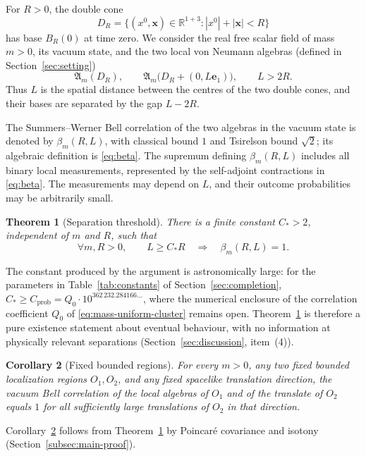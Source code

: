 \documentclass[11pt]{amsart}
\numberwithin{equation}{section}
\newtheorem{theorem}{Theorem}[section]
\newtheorem{corollary}[theorem]{Corollary}
\theoremstyle{definition}
\newcommand{\A}{\mathfrak A}
\newcommand{\R}{\mathbb R}
\newcommand{\bx}{\mathbf x}
\newcommand{\eone}{\mathbf e_1}
\begin{document}
For \(R>0\), the double cone
\[
 D_R=\{(x^0,\bx)\in\R^{1+3}: |x^0|+|\bx|<R\}
\]
has base \(B_R(0)\) at time zero. We consider the real free scalar field
of mass \(m>0\), its vacuum state, and the two local von Neumann algebras (defined in
Section~\ref{sec:setting})
\[
 \A_m(D_R),\qquad \A_m\bigl(D_R+(0,L\eone)\bigr),\qquad L>2R.
\]
Thus \(L\) is the spatial distance between the centres of the two
double cones, and their bases are separated by the gap \(L-2R\).

The Summers--Werner Bell correlation of the two algebras in the vacuum
state is denoted by
\(\beta_m(R,L)\), with classical bound \(1\) and Tsirelson bound
\(\sqrt2\); its algebraic definition is \eqref{eq:beta}. The supremum defining
\(\beta_m(R,L)\) includes all binary local measurements, represented by the
self-adjoint contractions in \eqref{eq:beta}. The measurements may depend on \(L\), and their outcome probabilities may be
arbitrarily small.

\begin{theorem}[Separation threshold]\label{thm:main}
There is a finite constant \(C_*>2\), independent of \(m\) and \(R\),
such that
\begin{equation}
 \forall m,R>0,\qquad
 L\ge C_*R\quad\Longrightarrow\quad \beta_m(R,L)=1.
 \label{eq:main}
\end{equation}
\end{theorem}

The constant produced by the argument is astronomically large: for the
parameters in Table~\ref{tab:constants} of Section~\ref{sec:completion}, \(C_*\ge C_{\mathrm{prob}}=Q_0\cdot10^{362\,232.284166\ldots}\), where the
numerical enclosure of the correlation coefficient \(Q_0\) of
\eqref{eq:mass-uniform-cluster} remains open. Theorem~\ref{thm:main} is therefore a pure
existence statement about eventual behaviour, with no information at
physically relevant separations (Section~\ref{sec:discussion},
item~(4)).

\begin{corollary}[Fixed bounded regions]\label{cor:fixed}
For every \(m>0\), any two fixed bounded localization regions
\(O_1,O_2\), and any fixed spacelike translation direction, the vacuum
Bell correlation of the local algebras of \(O_1\) and of the translate
of \(O_2\) equals \(1\) for all sufficiently large translations of
\(O_2\) in that direction.
\end{corollary}

Corollary~\ref{cor:fixed} follows from Theorem~\ref{thm:main} by
Poincar\'e covariance and isotony (Section~\ref{subsec:main-proof}).
\end{document}
